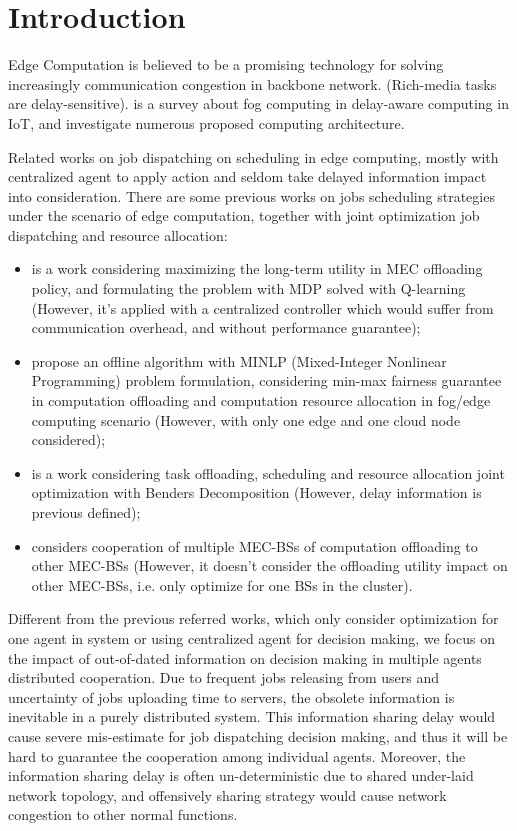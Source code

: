 
\section{Introduction}
Edge Computation is believed to be a promising technology for solving increasingly communication congestion in backbone network.
(Rich-media tasks are delay-sensitive).
\cite{Naha2018} is a survey about fog computing in delay-aware computing in IoT, and investigate numerous proposed computing architecture.


Related works on job dispatching on scheduling in edge computing, mostly with centralized agent to apply action and seldom take delayed information impact into consideration.
There are some previous works on jobs scheduling strategies under the scenario of edge computation, together with joint optimization job dispatching and resource allocation:
\begin{itemize}
    \item \cite{Zheng2019} is a work considering maximizing the long-term utility in MEC offloading policy, and formulating the problem with MDP solved with Q-learning (However, it's applied with a centralized controller which would suffer from communication overhead, and without performance guarantee);
    \item \cite{Du2018} propose an offline algorithm with MINLP (Mixed-Integer Nonlinear Programming) problem formulation, considering min-max fairness guarantee in computation offloading and computation resource allocation in fog/edge computing scenario (However, with only one edge and one cloud node considered);
    \item \cite{Alameddine2019} is a work considering task offloading, scheduling and resource allocation joint optimization with Benders Decomposition (However, delay information is previous defined);
    \item \cite{Fan2017} considers cooperation of multiple MEC-BSs of computation offloading to other MEC-BSs (However, it doesn't consider the offloading utility impact on other MEC-BSs, i.e. only optimize for one BSs in the cluster).
\end{itemize}


Different from the previous referred works, which only consider optimization for one agent in system or using centralized agent for decision making, we focus on the impact of out-of-dated information on decision making in multiple agents distributed cooperation.
Due to frequent jobs releasing from users and uncertainty of jobs uploading time to servers, the obsolete information is inevitable in a purely distributed system.
This information sharing delay would cause severe mis-estimate for job dispatching decision making, and thus it will be hard to guarantee the cooperation among individual agents.
Moreover, the information sharing delay is often un-deterministic due to shared under-laid network topology, and offensively sharing strategy would cause network congestion to other normal functions.



